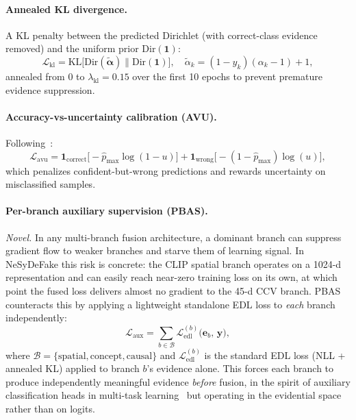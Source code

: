 \documentclass{article}
\begin{document}
\paragraph{Annealed KL divergence.}
A KL penalty between the predicted Dirichlet (with correct-class evidence removed) and the uniform prior $\text{Dir}(\bm{1})$:
\begin{equation}
  \mathcal{L}_\text{kl} = \text{KL}\bigl[\text{Dir}(\tilde{\bm{\alpha}}) \| \text{Dir}(\bm{1})\bigr], \quad
  \tilde{\alpha}_k = (1 - y_k)(\alpha_k - 1) + 1,
  \label{eq:kl}
\end{equation}
annealed from 0 to $\lambda_\text{kl}{=}0.15$ over the first 10 epochs to prevent premature evidence suppression.

\paragraph{Accuracy-vs-uncertainty calibration (AVU).}
Following~\citet{karandikar2021soft}:
\begin{equation}
  \mathcal{L}_\text{avu} = \bm{1}_\text{correct}\bigl[-\hat{p}_\text{max}\log(1{-}u)\bigr]
    + \bm{1}_\text{wrong}\bigl[-(1{-}\hat{p}_\text{max})\log(u)\bigr],
  \label{eq:avu}
\end{equation}
which penalizes confident-but-wrong predictions and rewards uncertainty on misclassified samples.

\paragraph{Per-branch auxiliary supervision (PBAS).}
\emph{Novel.} In any multi-branch fusion architecture, a dominant branch can suppress gradient flow to weaker branches and starve them of learning signal. In NeSyDeFake this risk is concrete: the CLIP spatial branch operates on a 1024-d representation and can easily reach near-zero training loss on its own, at which point the fused loss delivers almost no gradient to the 45-d CCV branch. PBAS counteracts this by applying a lightweight standalone EDL loss to \emph{each} branch independently:
\begin{equation}
  \mathcal{L}_\text{aux} = \sum_{b \in \mathcal{B}} \mathcal{L}_\text{edl}^{(b)}\bigl(\bm{e}_b,\, \bm{y}\bigr),
  \label{eq:pbas}
\end{equation}
where $\mathcal{B} = \{\text{spatial}, \text{concept}, \text{causal}\}$ and $\mathcal{L}_\text{edl}^{(b)}$ is the standard EDL loss (NLL + annealed KL) applied to branch $b$'s evidence alone. This forces each branch to produce independently meaningful evidence \emph{before} fusion, in the spirit of auxiliary classification heads in multi-task learning~\citep{szegedy2015going,caruana1997multitask} but operating in the evidential space rather than on logits.
\end{document}
